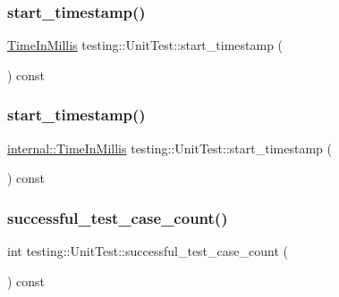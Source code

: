 \subsubsection{\texorpdfstring{start\_timestamp()}{start\_timestamp()}\hspace{0.1cm}{\footnotesize\ttfamily [2/3]}}
{\footnotesize\ttfamily \mbox{\hyperlink{namespacetesting_a992de1d091ce660f451d1e8b3ce30fd6}{Time\+In\+Millis}} testing\+::\+Unit\+Test\+::start\+\_\+timestamp (\begin{DoxyParamCaption}{ }\end{DoxyParamCaption}) const}

\mbox{\label{classtesting_1_1_unit_test_a3d83fe1cc5570a1c34f9754b0f56d65f}} 
\subsubsection{\texorpdfstring{start\_timestamp()}{start\_timestamp()}\hspace{0.1cm}{\footnotesize\ttfamily [3/3]}}
{\footnotesize\ttfamily \mbox{\hyperlink{namespacetesting_1_1internal_a5eed833eddf9ea8ca45546c125f4ef0c}{internal\+::\+Time\+In\+Millis}} testing\+::\+Unit\+Test\+::start\+\_\+timestamp (\begin{DoxyParamCaption}{ }\end{DoxyParamCaption}) const}

\mbox{\label{classtesting_1_1_unit_test_acaa2ab71f53c25ffe0242a91c14e173f}} 
\subsubsection{\texorpdfstring{successful\_test\_case\_count()}{successful\_test\_case\_count()}\hspace{0.1cm}{\footnotesize\ttfamily [1/3]}}
{\footnotesize\ttfamily int testing\+::\+Unit\+Test\+::successful\+\_\+test\+\_\+case\+\_\+count (\begin{DoxyParamCaption}{ }\end{DoxyParamCaption}) const}

